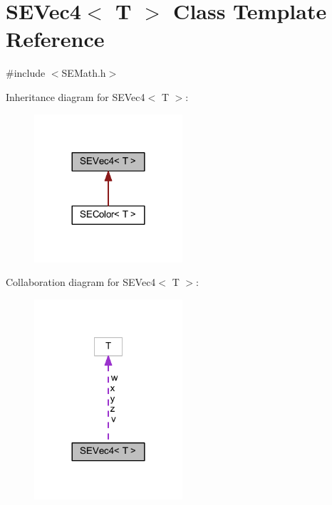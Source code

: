 \section{S\+E\+Vec4$<$ T $>$ Class Template Reference}
\label{class_s_e_vec4}


{\ttfamily \#include $<$S\+E\+Math.\+h$>$}



Inheritance diagram for S\+E\+Vec4$<$ T $>$\+:
\nopagebreak
\begin{figure}[H]
\begin{center}
\leavevmode
\includegraphics[width=156pt]{class_s_e_vec4__inherit__graph}
\end{center}
\end{figure}


Collaboration diagram for S\+E\+Vec4$<$ T $>$\+:
\nopagebreak
\begin{figure}[H]
\begin{center}
\leavevmode
\includegraphics[width=156pt]{class_s_e_vec4__coll__graph}
\end{center}
\end{figure}
